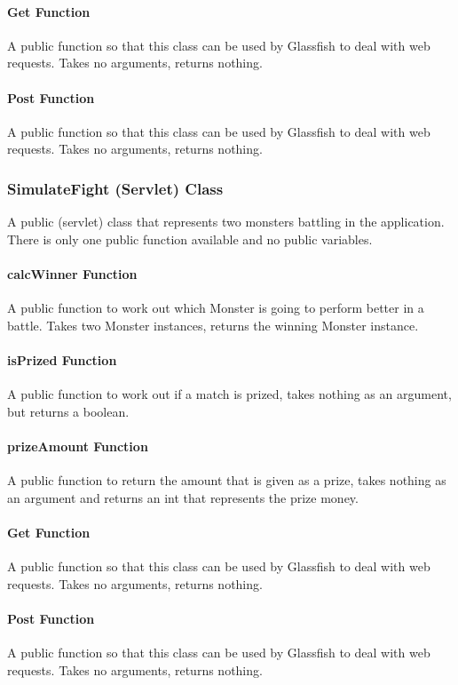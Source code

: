 \documentclass[titlepage]{article}
\begin{document}
\paragraph{Get Function}
A public function so that this class can be used by Glassfish to deal with web requests. Takes no arguments, returns nothing.

\paragraph{Post Function}
A public function so that this class can be used by Glassfish to deal with web requests. Takes no arguments, returns nothing.

\subsubsection{SimulateFight (Servlet) Class}
A public (servlet) class that represents two monsters battling in the application. There is only one public function available and no public variables.

\paragraph{calcWinner Function}
A public function to work out which Monster is going to perform better in a battle. Takes two Monster instances, returns the winning Monster instance.

\paragraph{isPrized Function}
A public function to work out if a match is prized, takes nothing as an argument, but returns a boolean.

\paragraph{prizeAmount Function}
A public function to return the amount that is given as a prize, takes nothing as an argument and returns an int that represents the prize money.

\paragraph{Get Function}
A public function so that this class can be used by Glassfish to deal with web requests. Takes no arguments, returns nothing.

\paragraph{Post Function}
A public function so that this class can be used by Glassfish to deal with web requests. Takes no arguments, returns nothing.
\newpage
\end{document}
